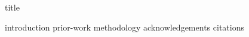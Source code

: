 \documentclass {journal}
\begin{document}
\def \JoDPagesTotal {2215}
\def \JoDPagesGoldStandard {2215}
\def \JoDCitationsTotal {11000}

 {title}

 {introduction}
 {prior-work}
 {methodology}
 {acknowledgements}
 {citations}
\end{document}
